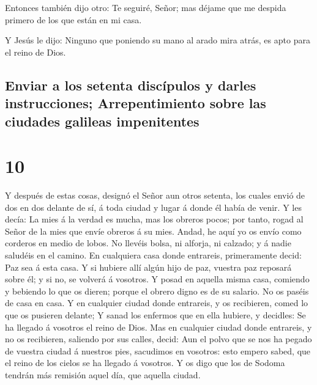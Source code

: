  Entonces también dijo otro: Te seguiré, Señor; mas
déjame que me despida primero de los que están en mi casa.

 Y Jesús le dijo: Ninguno que poniendo su mano al arado
mira atrás, es apto para el reino de Dios.

\hypertarget{enviar-a-los-setenta-discuxedpulos-y-darles-instrucciones-arrepentimiento-sobre-las-ciudades-galileas-impenitentes}{%
\subsection{Enviar a los setenta discípulos y darles instrucciones;
Arrepentimiento sobre las ciudades galileas
impenitentes}\label{enviar-a-los-setenta-discuxedpulos-y-darles-instrucciones-arrepentimiento-sobre-las-ciudades-galileas-impenitentes}}

\hypertarget{section-42-10}{%
\section{10}\label{section-42-10}}

 Y después de estas cosas, designó el Señor aun otros
setenta, los cuales envió de dos en dos delante de sí, á toda ciudad y
lugar á donde él había de venir.  Y les decía: La mies á
la verdad es mucha, mas los obreros pocos; por tanto, rogad al Señor de
la mies que envíe obreros á su mies.  Andad, he aquí yo os
envío como corderos en medio de lobos.  No llevéis bolsa,
ni alforja, ni calzado; y á nadie saludéis en el camino. 
En cualquiera casa donde entrareis, primeramente decid: Paz sea á esta
casa.  Y si hubiere allí algún hijo de paz, vuestra paz
reposará sobre él; y si no, se volverá á vosotros.  Y
posad en aquella misma casa, comiendo y bebiendo lo que os dieren;
porque el obrero digno es de su salario. No os paséis de casa en casa.
 Y en cualquier ciudad donde entrareis, y os recibieren,
comed lo que os pusieren delante;  Y sanad los enfermos
que en ella hubiere, y decidles: Se ha llegado á vosotros el reino de
Dios.  Mas en cualquier ciudad donde entrareis, y no os
recibieren, saliendo por sus calles, decid:  Aun el polvo
que se nos ha pegado de vuestra ciudad á nuestros pies, sacudimos en
vosotros: esto empero sabed, que el reino de los cielos se ha llegado á
vosotros.  Y os digo que los de Sodoma tendrán más
remisión aquel día, que aquella ciudad.

